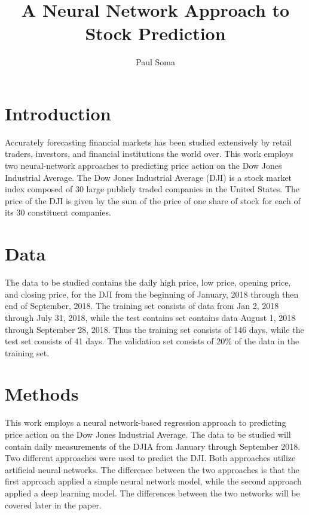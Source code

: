 \documentclass[acmtog, authorversion]{acmart}
\begin{document}
\title{A Neural Network Approach to Stock Prediction}

\author{Paul Soma}


\maketitle


\section{Introduction}
Accurately forecasting financial markets has been studied extensively by retail traders, investors, and financial institutions the world over. This work employs two neural-network approaches to predicting price action on the Dow Jones Industrial Average.
The Dow Jones Industrial Average (DJI) is a stock market index composed of 30 large publicly traded companies in the United States. The price of the DJI is given by the sum of the price of one share of stock for each of its 30 constituent companies\cite{economics}.

\section{Data}
The data to be studied contains the daily high price, low price, opening price, and closing price, for the DJI from the beginning of January, 2018 through then end of September, 2018. The training set consists of data from Jan 2, 2018 through July 31, 2018, while the test contains set contains data August 1, 2018 through September 28, 2018. Thus the training set consists of 146 days, while the test set consists of 41 days. The validation set consists of 20\% of the data in the training set.

\section{Methods}
This work employs a neural network-based regression approach to predicting price action on the Dow Jones Industrial Average. The data to be studied will contain daily measurements of the DJIA from January through September 2018. Two different approaches were used to predict the DJI. Both approaches utilize artificial neural networks. The difference between the two approaches is that the first approach applied a simple neural network model, while the second approach applied a deep learning model. The differences between the two networks will be covered later in the paper.
\end{document}
